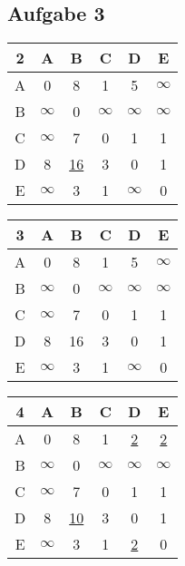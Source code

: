 \documentclass[a4paper,graphics,11pt]{article}
\newcommand{\aufgabe}[1]{\subsection*{Aufgabe #1}}
\begin{document}
\aufgabe{3}

\begin{tabular}{c|c|c|c|c|c}
    2 & A & B & C & D & E\\
    \hline
    A & 0 & 8 & 1 & 5 & $\infty$\\
    \hline
    B & $\infty$ & 0 & $\infty$ & $\infty$ & $\infty$\\
    \hline
    C & $\infty$ & 7 & 0 & 1 & 1\\
    \hline
    D & 8 & \underline{16} & 3 & 0 & 1\\
    \hline
    E & $\infty$ & 3 & 1 & $\infty$ & 0\\
\end{tabular}
\qquad
\begin{tabular}{c|c|c|c|c|c}
    3 & A & B & C & D & E\\
    \hline
    A & 0 & 8 & 1 & 5 & $\infty$\\
    \hline
    B & $\infty$ & 0 & $\infty$ & $\infty$ & $\infty$\\
    \hline
    C & $\infty$ & 7 & 0 & 1 & 1\\
    \hline
    D & 8 & 16 & 3 & 0 & 1\\
    \hline
    E & $\infty$ & 3 & 1 & $\infty$ & 0\\
\end{tabular}
\qquad
\begin{tabular}{c|c|c|c|c|c}
    4 & A & B & C & D & E\\
    \hline
    A & 0 & 8 & 1 & \underline{2} & \underline{2}\\
    \hline
    B & $\infty$ & 0 & $\infty$ & $\infty$ & $\infty$\\
    \hline
    C & $\infty$ & 7 & 0 & 1 & 1\\
    \hline
    D & 8 & \underline{10} & 3 & 0 & 1\\
    \hline
    E & $\infty$ & 3 & 1 & \underline{2} & 0\\
\end{tabular}
\end{document}
